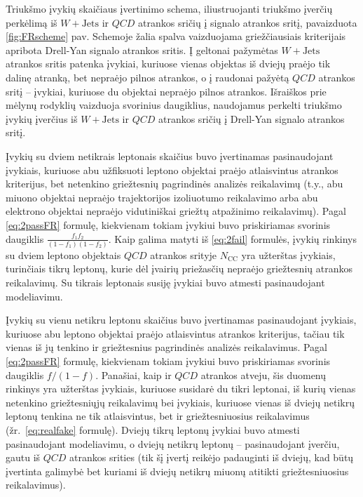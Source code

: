 \documentclass[a4paper, 12pt, oneside]{article}
\newcommand{\WJets}{W\! +\!\mathrm{Jets}}
\newcommand{\QCD}{QC\! D}
\newlength\q
\begin{document}
Triukšmo įvykių skaičiaus įvertinimo schema, iliustruojanti triukšmo įverčių perkėlimą iš $\WJets$ ir $\QCD$ atrankos sričių
į signalo atrankos sritį, pavaizduota \ref{fig:FRscheme} pav.
Schemoje žalia spalva vaizduojama griežčiausiais kriterijais apribota Drell-Yan signalo atrankos sritis.
Į geltonai pažymėtas $\WJets$ atrankos sritis patenka įvykiai, kuriuose vienas objektas iš dviejų praėjo tik dalinę atranką,
bet nepraėjo pilnos atrankos, o į raudonai pažyėtą $\QCD$ atrankos sritį -- įvykiai, kuriuose du objektai nepraėjo pilnos atrankos.
Išraiškos prie mėlynų rodyklių vaizduoja svorinius daugiklius, naudojamus perkelti triukšmo įvykių įverčius iš $\WJets$
ir $\QCD$ atrankos sričių į Drell-Yan signalo atrankos sritį.

Įvykių su dviem netikrais leptonais skaičius buvo įvertinamas pasinaudojant įvykiais, kuriuose abu užfiksuoti
leptono objektai praėjo atlaisvintus atrankos kriterijus, bet netenkino griežtesnių pagrindinės analizės reikalavimų (t.y., abu
miuono objektai nepraėjo trajektorijos izoliuotumo reikalavimo arba abu elektrono objektai nepraėjo vidutiniškai griežtų
atpažinimo reikalavimų).
Pagal \eqref{eq:2passFR} formulę, kiekvienam tokiam įvykiui buvo priskiriamas svorinis daugiklis $\frac{f_1 f_2}{(1-f_1)(1-f_2)}$.
Kaip galima matyti iš \eqref{eq:2fail} formulės, įvykių rinkinys su dviem leptono objektais $\QCD$ atrankos srityje $N_{\mathrm{CC}}$
yra užterštas įvykiais, turinčiais tikrų leptonų, kurie dėl įvairių priežasčių nepraėjo griežtesnių atrankos reikalavimų.
Su tikrais leptonais susiję įvykiai buvo atmesti pasinaudojant modeliavimu.

Įvykių su vienu netikru leptonu skaičius buvo įvertinamas pasinaudojant įvykiais, kuriuose abu leptono objektai
praėjo atlaisvintus atrankos kriterijus, tačiau tik vienas iš jų tenkino ir griežtesnius pagrindinės analizės reikalavimus.
Pagal \eqref{eq:2passFR} formulę, kiekvienam tokiam įvykiui buvo priskiriamas svorinis daugiklis $f/(1-f)$.
Panašiai, kaip ir $\QCD$ atrankos atveju, šis duomenų rinkinys yra užterštas įvykiais, kuriuose susidarė du tikri leptonai,
iš kurių vienas netenkino griežtesniųjų reikalavimų bei įvykiais, kuriuose vienas iš dviejų netikrų leptonų tenkina
ne tik atlaisvintus, bet ir griežtesniuosius reikalavimus (žr.\ \ref{eq:realfake} formulę).
Dviejų tikrų leptonų įvykiai buvo atmesti pasinaudojant modeliavimu, o dviejų netikrų leptonų -- pasinaudojant įverčiu, gautu
iš $\QCD$ atrankos srities (tik šį įvertį reikėjo padauginti iš dviejų, kad būtų įvertinta galimybė bet kuriami iš dviejų
netikrų miuonų atitikti griežtesniuosius reikalavimus).
\end{document}
